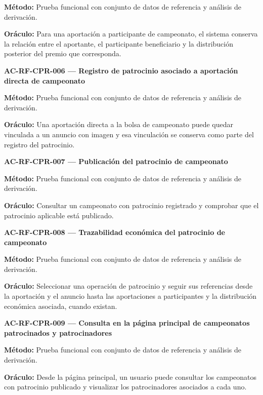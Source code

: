 \documentclass[10pt,letterpaper]{article}
\begin{document}
\textbf{Método:} Prueba funcional con conjunto de datos de referencia y análisis de derivación.\par
\textbf{Oráculo:} Para una aportación a participante de campeonato, el sistema conserva la relación entre el aportante, el participante beneficiario y la distribución posterior del premio que corresponda.\par\vspace{0.45em}
\noindent\textbf{AC-RF-CPR-006 --- Registro de patrocinio asociado a aportación directa de campeonato}\par
\textbf{Método:} Prueba funcional con conjunto de datos de referencia y análisis de derivación.\par
\textbf{Oráculo:} Una aportación directa a la bolsa de campeonato puede quedar vinculada a un anuncio con imagen y esa vinculación se conserva como parte del registro del patrocinio.\par\vspace{0.45em}
\noindent\textbf{AC-RF-CPR-007 --- Publicación del patrocinio de campeonato}\par
\textbf{Método:} Prueba funcional con conjunto de datos de referencia y análisis de derivación.\par
\textbf{Oráculo:} Consultar un campeonato con patrocinio registrado y comprobar que el patrocinio aplicable está publicado.\par\vspace{0.45em}
\noindent\textbf{AC-RF-CPR-008 --- Trazabilidad económica del patrocinio de campeonato}\par
\textbf{Método:} Prueba funcional con conjunto de datos de referencia y análisis de derivación.\par
\textbf{Oráculo:} Seleccionar una operación de patrocinio y seguir sus referencias desde la aportación y el anuncio hasta las aportaciones a participantes y la distribución económica asociada, cuando existan.\par\vspace{0.45em}
\noindent\textbf{AC-RF-CPR-009 --- Consulta en la página principal de campeonatos patrocinados y patrocinadores}\par
\textbf{Método:} Prueba funcional con conjunto de datos de referencia y análisis de derivación.\par
\textbf{Oráculo:} Desde la página principal, un usuario puede consultar los campeonatos con patrocinio publicado y visualizar los patrocinadores asociados a cada uno.\par\vspace{0.45em}
\end{document}
